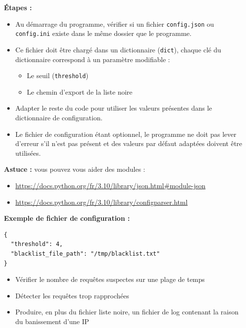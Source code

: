 \documentclass[12pt, a4paper]{exam}
\begin{document}
\begin{questions}
  \textbf{Étapes :}
  \begin{itemize}
    \item Au démarrage du programme, vérifier si un fichier \texttt{config.json} ou
          \texttt{config.ini} existe dans le même dossier que le programme.
    \item Ce fichier doit être chargé dans un dictionnaire (\texttt{dict}), chaque clé du
          dictionnaire correspond à un paramètre modifiable :
          \begin{itemize}
            \item Le seuil (\texttt{threshold})
            \item Le chemin d'export de la liste noire
          \end{itemize}
    \item Adapter le reste du code pour utiliser les valeurs présentes dans le
          dictionnaire de configuration.
    \item Le fichier de configuration étant optionnel, le programme ne doit pas lever
          d'erreur s'il n'est pas présent et des valeurs par défaut adaptées doivent être
          utilisées.
  \end{itemize}

  \textbf{Astuce :} vous pouvez vous aider des modules :
  \begin{itemize}
    \item \url{https://docs.python.org/fr/3.10/library/json.html#module-json}
    \item \url{https://docs.python.org/fr/3.10/library/configparser.html}
  \end{itemize}

  \textbf{Exemple de fichier de configuration :}
  \begin{verbatim}
{
  "threshold": 4,
  "blacklist_file_path": "/tmp/blacklist.txt"
}
\end{verbatim}


  \begin{itemize}
    \item Vérifier le nombre de requêtes suspectes sur une plage de temps
    \item Détecter les requêtes trop rapprochées
    \item Produire, en plus du fichier liste noire, un fichier de log contenant la raison du banissement d'une IP
  \end{itemize}

\end{questions}
\end{document}
